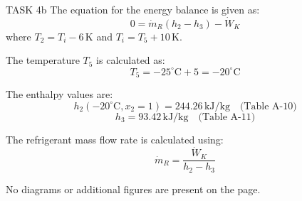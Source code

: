 TASK 4b  
The equation for the energy balance is given as:  
\[
0 = \dot{m}_R (h_2 - h_3) - \dot{W}_K
\]  
where \( T_2 = T_i - 6 \, \text{K} \) and \( T_i = T_5 + 10 \, \text{K} \).  

The temperature \( T_5 \) is calculated as:  
\[
T_5 = -25^\circ\text{C} + 5 = -20^\circ\text{C}
\]  

The enthalpy values are:  
\[
h_2(-20^\circ\text{C}, x_2 = 1) = 244.26 \, \text{kJ/kg} \quad \text{(Table A-10)}
\]  
\[
h_3 = 93.42 \, \text{kJ/kg} \quad \text{(Table A-11)}
\]  

The refrigerant mass flow rate is calculated using:  
\[
\dot{m}_R = \frac{\dot{W}_K}{h_2 - h_3}
\]  

No diagrams or additional figures are present on the page.